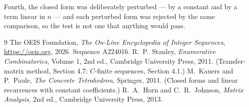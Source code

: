 \documentclass[11pt,a4paper]{article}
\theoremstyle{plain}
\theoremstyle{definition}
\begin{document}
Fourth, the closed form was deliberately perturbed --- by a constant and by a term linear in
$n$ --- and each perturbed form was rejected by the same comparison, so the test is not one
that anything would pass.

\begin{thebibliography}{9}
 The OEIS Foundation, \emph{The On-Line Encyclopedia of Integer
Sequences}, \url{https://oeis.org}, 2026. Sequence A224016.
 R.~P.~Stanley, \emph{Enumerative Combinatorics}, Volume 1, 2nd ed.,
Cambridge University Press, 2011. (Transfer-matrix method, Section 4.7; $C$-finite sequences,
Section 4.1.)
 M.~Kauers and P.~Paule, \emph{The Concrete Tetrahedron}, Springer, 2011.
(Closed forms and linear recurrences with constant coefficients.)
 R.~A.~Horn and C.~R.~Johnson, \emph{Matrix Analysis}, 2nd ed., Cambridge
University Press, 2013.
\end{thebibliography}
\end{document}

